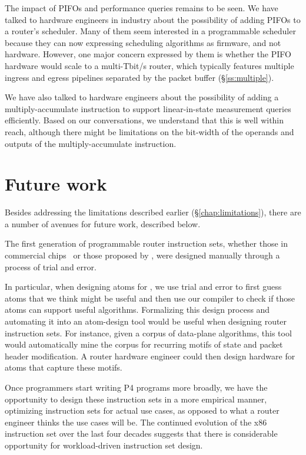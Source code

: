 The impact of PIFOs and performance queries remains to be seen. We have talked
to hardware engineers in industry about the possibility of adding PIFOs to a
router's scheduler. Many of them seem interested in a programmable scheduler
because they can now expressing scheduling algorithms as firmware, and not
hardware. However, one major concern expressed by them is whether the PIFO
hardware would scale to a multi-Tbit/s router, which typically features
multiple ingress and egress pipelines separated by the packet buffer
(\S\ref{ss:multiple}).

We have also talked to hardware engineers about the possibility of adding a
multiply-accumulate instruction to support linear-in-state measurement queries
efficiently. Based on our conversations, we understand that this is well within
reach, although there might be limitations on the bit-width of the operands and
outputs of the multiply-accumulate instruction.

\section{Future work}
\label{s:future}

Besides addressing the limitations described earlier (\S\ref{chap:limitations}),
there are a number of avenues for future work, described below.

 The first generation of programmable
router instruction sets, whether those in commercial chips~\cite{xpliant,
flexpipe, tofino, rmt} or those proposed by \pktlanguage, were designed
manually through a process of trial and error.

In particular, when designing atoms for \pktlanguage, we use trial and error to
first guess atoms that we think might be useful and then use our compiler to
check if those atoms can support useful algorithms.  Formalizing this design
process and automating it into an atom-design tool would be useful when
designing router instruction sets. For instance, given a corpus of data-plane
algorithms, this tool would automatically mine the corpus for recurring motifs
of state and packet header modification. A router hardware engineer could then
design hardware for atoms that capture these motifs.

 Once programmers start writing P4 programs more broadly, we have the
opportunity to design these instruction sets in a more empirical manner,
optimizing instruction sets for actual use cases, as opposed to what a router
engineer thinks the use cases will be. The continued evolution of the x86
instruction set over the last four decades suggests that there is considerable
opportunity for workload-driven instruction set design.

